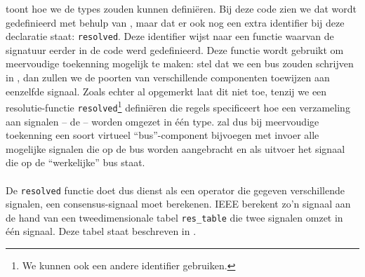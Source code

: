  toont hoe we de types zouden kunnen defini\"eren. Bij deze code zien we dat  wordt gedefinieerd met behulp van , maar dat er ook nog een extra identifier bij deze declaratie staat: \texttt{resolved}. Deze identifier wijst naar een functie waarvan de signatuur eerder in de code werd gedefinieerd. Deze functie wordt gebruikt om meervoudige toekenning mogelijk te maken: stel dat we een bus zouden schrijven in \tvhdl{}, dan zullen we de poorten van verschillende componenten toewijzen aan eenzelfde signaal. Zoals echter al opgemerkt laat \tvhdl{} dit niet toe, tenzij we een resolutie-functie \texttt{resolved}\footnote{We kunnen ook een andere identifier gebruiken.} defini\"eren die regels specificeert hoe een verzameling aan signalen -- de  -- worden omgezet in \'e\'en type. \tvhdl{} zal dus bij meervoudige toekenning een soort virtueel ``bus''-component bijvoegen met invoer alle mogelijke signalen die op de bus worden aangebracht en als uitvoer het signaal die op de ``werkelijke'' bus staat.

\paragraph{}
De \texttt{resolved} functie doet dus dienst als een operator die gegeven verschillende signalen, een consensus-signaal moet berekenen. IEEE berekent zo'n signaal aan de hand van een tweedimensionale tabel \texttt{res\_table} die twee signalen omzet in \'e\'en signaal. Deze tabel staat beschreven in .


